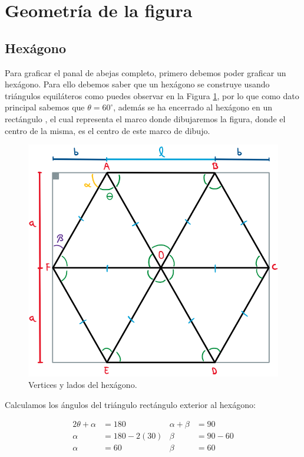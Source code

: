 \documentclass[oneside, a4paper]{article}
\begin{document}
    \section{Geometría de la figura}
        \subsection{Hexágono}
            Para graficar el panal de abejas completo, primero debemos poder graficar un hexágono. Para ello debemos saber que un hexágono se construye usando triángulos equiláteros como puedes observar en la Figura \ref{fig:hexagon}, por lo que como dato principal sabemos que $\theta = 60^{\circ} $, además se ha encerrado al hexágono en un rectángulo , el cual representa el marco donde dibujaremos la figura, donde el centro de la misma, es el centro de este marco de dibujo.

            \begin{figure}[H]
                \centering
                \includegraphics[scale=0.45]{hexagon.png}
                \caption{Vertices y lados del hexágono.}
                \label{fig:hexagon}
            \end{figure}

            Calculamos los ángulos del triángulo rectángulo exterior al hexágono:

            \begin{align*}
                2\theta + \alpha & = 180         & \alpha + \beta & = 90      \\
                \alpha           & = 180 - 2(30) & \beta          & = 90 - 60 \\
                \alpha           & = 60          & \beta          & = 60
            \end{align*}
\end{document}
